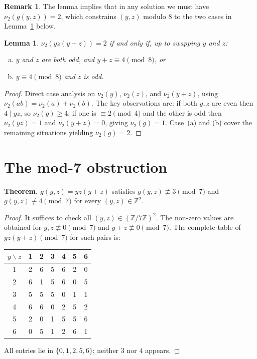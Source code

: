 \documentclass[12pt, a4paper]{article}
\newtheorem{lemma}[theorem]{Lemma}
\theoremstyle{definition}
\newtheorem{remark}[theorem]{Remark}
\newcommand{\Z}{\mathbb{Z}}
\begin{document}
\begin{remark}
The lemma implies that in any solution we must have $\nu_2(g(y,z))=2$,
which constrains $(y,z)$ modulo $8$ to the two cases in
Lemma~\ref{lem:twadic-yz} below.
\end{remark}

\begin{lemma}\label{lem:twadic-yz}
$\nu_2(yz(y+z))=2$ if and only if, up to swapping $y$ and $z$:
\begin{enumerate}[(a)]
  \item $y$ and $z$ are both odd, and $y+z\equiv 4\pmod{8}$, or
  \item $y\equiv4\pmod{8}$ and $z$ is odd.
\end{enumerate}
\end{lemma}

\begin{proof}
Direct case analysis on $\nu_2(y)$, $\nu_2(z)$, and $\nu_2(y+z)$,
using $\nu_2(ab)=\nu_2(a)+\nu_2(b)$. The key observations are:
if both $y,z$ are even then $4\mid yz$, so $\nu_2(g)\ge 4$;
if one is $\equiv 2\pmod4$ and the other is odd then $\nu_2(yz)=1$
and $\nu_2(y+z)=0$, giving $\nu_2(g)=1$. Case~(a) and (b) cover
the remaining situations yielding $\nu_2(g)=2$.
\end{proof}

\section{The mod-7 obstruction}
\label{sec:mod7}

\begin{tcolorbox}[myobs, title={Key Theorem}]
\textbf{Theorem.}
$g(y,z) = yz(y+z)$ satisfies $g(y,z)\not\equiv 3\pmod7$ and
$g(y,z)\not\equiv 4\pmod7$ for every $(y,z)\in\Z^2$.
\end{tcolorbox}

\begin{proof}
It suffices to check all $(y,z)\in(\Z/7\Z)^2$.  The non-zero values
are obtained for $y,z\not\equiv0\pmod7$ and $y+z\not\equiv0\pmod7$.
The complete table of $yz(y+z)\pmod7$ for such pairs is:

\begin{center}
\begin{tabular}{c|cccccc}
\toprule
$y\backslash z$ & 1 & 2 & 3 & 4 & 5 & 6 \\\midrule
1 & 2 & 6 & 5 & 6 & 2 & 0 \\
2 & 6 & 1 & 5 & 6 & 0 & 5 \\
3 & 5 & 5 & 5 & 0 & 1 & 1 \\
4 & 6 & 6 & 0 & 2 & 5 & 2 \\
5 & 2 & 0 & 1 & 5 & 5 & 6 \\
6 & 0 & 5 & 1 & 2 & 6 & 1 \\
\bottomrule
\end{tabular}
\end{center}

All entries lie in $\{0,1,2,5,6\}$; neither $3$ nor $4$ appears.
\end{proof}
\end{document}
